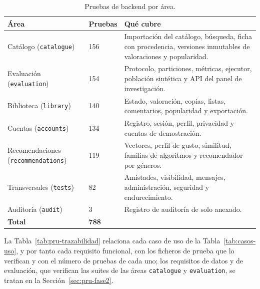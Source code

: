 \begin{table}[htp]
\centering
\begin{tabularx}{\textwidth}{ | L{0.24\textwidth} | C{0.12\textwidth} | Y | }
    \hline
    \textbf{Área} & \textbf{Pruebas} & \textbf{Qué cubre} \\
    \hline
    Catálogo (\texttt{catalogue}) & 156 & Importación del catálogo, búsqueda, ficha con procedencia, versiones inmutables de valoraciones y popularidad. \\
    \hline
    Evaluación (\texttt{evaluation}) & 154 & Protocolo, particiones, métricas, ejecutor, población sintética y API del panel de investigación. \\
    \hline
    Biblioteca (\texttt{library}) & 140 & Estado, valoración, copias, listas, comentarios, popularidad y exportación. \\
    \hline
    Cuentas (\texttt{accounts}) & 134 & Registro, sesión, perfil, privacidad y cuentas de demostración. \\
    \hline
    Recomendaciones (\texttt{recommendations}) & 119 & Vectores, perfil de gusto, similitud, familias de algoritmos y recomendador por géneros. \\
    \hline
    Transversales (\texttt{tests}) & 82 & Amistades, visibilidad, mensajes, administración, seguridad y endurecimiento. \\
    \hline
    Auditoría (\texttt{audit}) & 3 & Registro de auditoría de solo anexado. \\
    \hline
    \textbf{Total} & \textbf{788} & \\
    \hline
\end{tabularx}
\caption{Pruebas de backend por área.}
\label{tab:pru-areas}
\end{table}

La Tabla~\ref{tab:pru-trazabilidad} relaciona cada caso de uso de la Tabla~\ref{tab:casos-uso}, y por tanto
cada requisito funcional, con los ficheros de prueba que lo verifican y con el número de pruebas de cada uno; los
requisitos de datos y de evaluación, que verifican las suites de las áreas \texttt{catalogue} y
\texttt{evaluation}, se tratan en la Sección~\ref{sec:pru-fase2}.

